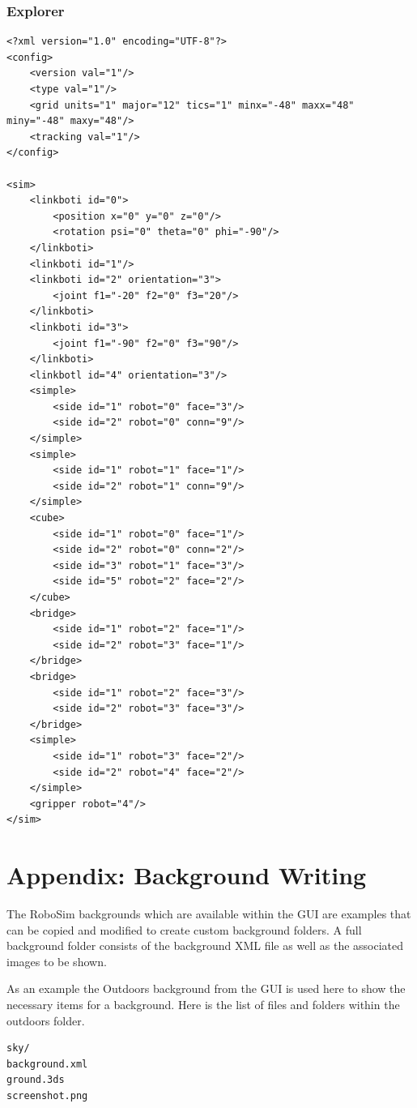\documentclass{article}
\begin{document}
\subsubsection{Explorer}
\begin{verbatim}
<?xml version="1.0" encoding="UTF-8"?>
<config>
    <version val="1"/>
    <type val="1"/>
	<grid units="1" major="12" tics="1" minx="-48" maxx="48" miny="-48" maxy="48"/>
    <tracking val="1"/>
</config>

<sim>
    <linkboti id="0">
        <position x="0" y="0" z="0"/>
        <rotation psi="0" theta="0" phi="-90"/>
    </linkboti>
    <linkboti id="1"/>
    <linkboti id="2" orientation="3">
        <joint f1="-20" f2="0" f3="20"/>
    </linkboti>
    <linkboti id="3">
        <joint f1="-90" f2="0" f3="90"/>
    </linkboti>
    <linkbotl id="4" orientation="3"/>
    <simple>
        <side id="1" robot="0" face="3"/>
        <side id="2" robot="0" conn="9"/>
    </simple>
    <simple>
        <side id="1" robot="1" face="1"/>
        <side id="2" robot="1" conn="9"/>
    </simple>
    <cube>
        <side id="1" robot="0" face="1"/>
        <side id="2" robot="0" conn="2"/>
        <side id="3" robot="1" face="3"/>
        <side id="5" robot="2" face="2"/>
    </cube>
    <bridge>
        <side id="1" robot="2" face="1"/>
        <side id="2" robot="3" face="1"/>
    </bridge>
    <bridge>
        <side id="1" robot="2" face="3"/>
        <side id="2" robot="3" face="3"/>
    </bridge>
    <simple>
        <side id="1" robot="3" face="2"/>
        <side id="2" robot="4" face="2"/>
    </simple>
    <gripper robot="4"/>
</sim>
\end{verbatim}

\newpage
\section{Appendix: Background Writing}
\label{appendix:backgroundxml}
The RoboSim backgrounds which are available within the GUI are examples that can
be copied and modified to create custom background folders.  A full background
folder consists of the background XML file as well as the associated images to
be shown.

As an example the Outdoors background from the GUI is used here to show the
necessary items for a background.  Here is the list of files and folders within
the outdoors folder.
\begin{verbatim}
sky/
background.xml
ground.3ds
screenshot.png
\end{verbatim}
\end{document}
